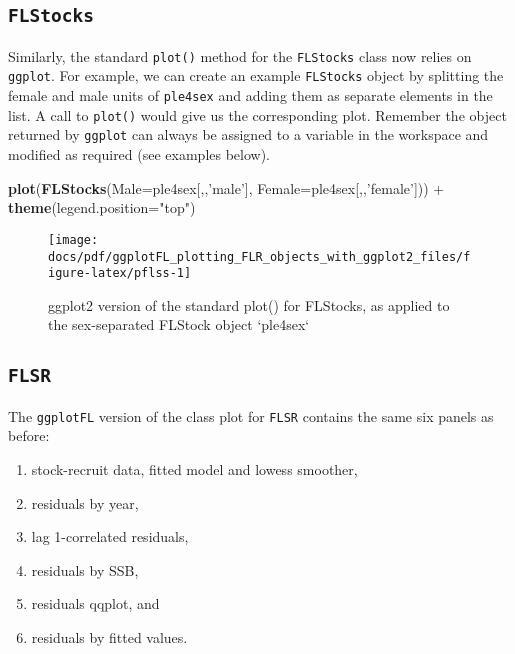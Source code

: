 \documentclass[]{article}
\newenvironment{Shaded}{\begin{snugshade}}{\end{snugshade}}
\newcommand{\KeywordTok}[1]{\textcolor[rgb]{0.13,0.29,0.53}{\textbf{{#1}}}}
\newcommand{\DataTypeTok}[1]{\textcolor[rgb]{0.13,0.29,0.53}{{#1}}}
\newcommand{\StringTok}[1]{\textcolor[rgb]{0.31,0.60,0.02}{{#1}}}
\newcommand{\NormalTok}[1]{{#1}}
\providecommand{\tightlist}{%
  \setlength{\itemsep}{0pt}\setlength{\parskip}{0pt}}
\begin{document}
\subsection{\texorpdfstring{\texttt{FLStocks}}{FLStocks}}\label{flstocks}

Similarly, the standard \texttt{plot()} method for the \texttt{FLStocks}
class now relies on \texttt{ggplot}. For example, we can create an
example \texttt{FLStocks} object by splitting the female and male units
of \texttt{ple4sex} and adding them as separate elements in the list. A
call to \texttt{plot()} would give us the corresponding plot. Remember
the object returned by \texttt{ggplot} can always be assigned to a
variable in the workspace and modified as required (see examples below).

\begin{Shaded}
\begin{Highlighting}[]
\KeywordTok{plot}\NormalTok{(}\KeywordTok{FLStocks}\NormalTok{(}\DataTypeTok{Male=}\NormalTok{ple4sex[,,}\StringTok{'male'}\NormalTok{], }\DataTypeTok{Female=}\NormalTok{ple4sex[,,}\StringTok{'female'}\NormalTok{])) +}\StringTok{ }\KeywordTok{theme}\NormalTok{(}\DataTypeTok{legend.position=}\StringTok{"top"}\NormalTok{)}
\end{Highlighting}
\end{Shaded}

\begin{figure}

{\centering \texttt{[image: docs/pdf/ggplotFL\_plotting\_FLR\_objects\_with\_ggplot2\_files/figure-latex/pflss-1]} 

}

\caption{ggplot2 version of the standard plot() for FLStocks, as applied to the sex-separated FLStock object `ple4sex`}\label{fig:pflss}
\end{figure}

\subsection{\texorpdfstring{\texttt{FLSR}}{FLSR}}\label{flsr}

The \texttt{ggplotFL} version of the class plot for \texttt{FLSR}
contains the same six panels as before:

\begin{enumerate}
\def\labelenumi{(\arabic{enumi})}
\tightlist
\item
  stock-recruit data, fitted model and lowess smoother,
\item
  residuals by year,
\item
  lag 1-correlated residuals,
\item
  residuals by SSB,
\item
  residuals qqplot, and
\item
  residuals by fitted values.
\end{enumerate}
\end{document}

